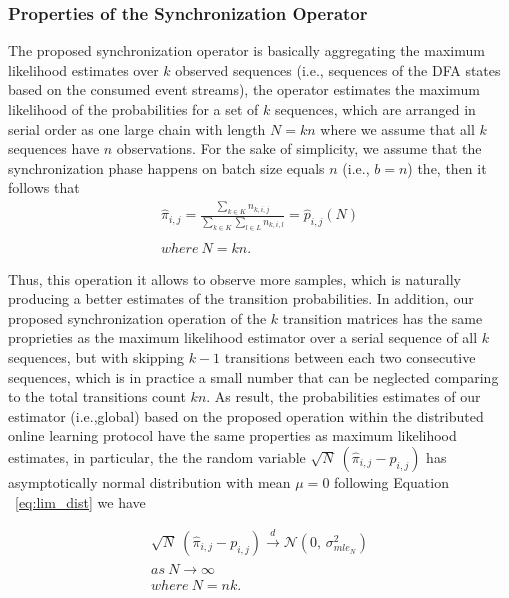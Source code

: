 \subsubsection{Properties of the Synchronization Operator}
\par The proposed synchronization operator is basically aggregating the maximum likelihood estimates over $k$ observed sequences (i.e., sequences of the DFA states based on the consumed event streams), the operator estimates the maximum likelihood of the probabilities for a set of $k$ sequences, which are arranged in serial order as one large chain with length $ N=kn$ where we assume that all $k$ sequences have $n$ observations. For the sake of simplicity, we assume that the synchronization phase happens on batch size equals $n$ (i.e., $b=n$) the, then it follows that 
\begin{equation}
\label{eq:dis_pi_estim2}
	\begin{aligned}
\hat{\pi}_{i,j}=\frac{\sum_{k \in K} n_{k,i,j}}{\sum_{k \in K} \sum_{l \in L} n_{k,i,l}} = \hat{p}_{i,j}(N)\\\\
 where\ N = kn.
 \end{aligned}
\end{equation}

\par Thus, this operation it allows to observe more samples, which is naturally producing a better estimates of the transition probabilities. In addition, our proposed synchronization operation of the $k$ transition matrices has the same proprieties as the maximum likelihood estimator over a serial sequence of all $k$ sequences, but with skipping $k-1$ transitions between each two consecutive sequences, which is in practice a small number that can be neglected comparing to the total transitions count $kn$. As result, the probabilities estimates of our estimator (i.e.,global) based on the proposed operation within the distributed online learning protocol have the same properties as maximum likelihood estimates, in particular, the the random variable $\sqrt{N}\ (\hat{\pi}_{i,j} - {p}_{i,j})$ has asymptotically normal distribution with mean $\mu=0$ following Equation ~\ref{eq:lim_dist} we have 

\begin{equation}
\begin{aligned}
\label{eq:lim_dist2}
\sqrt{N}\ (\hat{\pi}_{i,j} - {p}_{i,j}) \xrightarrow{d} \mathcal{N}(0,\,\sigma^{2}_{mle_N})\\
as\ N \xrightarrow{} \infty\\
where\ N = nk .\\
\end{aligned}
\end{equation}

